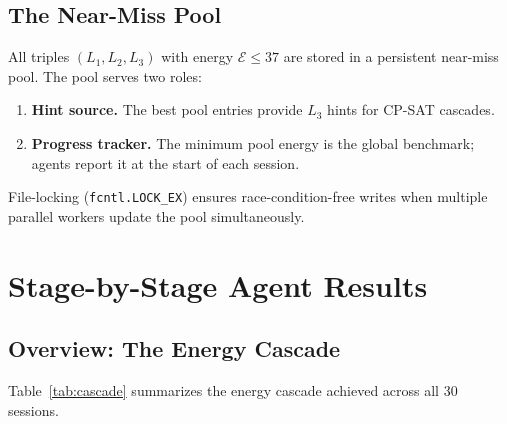 \documentclass[11pt,a4paper]{article}
\theoremstyle{remark}
\newcommand{\E}{\mathcal{E}}
\begin{document}
\subsection{The Near-Miss Pool}

All triples $(L_1, L_2, L_3)$ with energy $\E \leq 37$ are stored in a persistent near-miss
pool. The pool serves two roles:
\begin{enumerate}[noitemsep]
  \item \textbf{Hint source.} The best pool entries provide $L_3$ hints for CP-SAT cascades.
  \item \textbf{Progress tracker.} The minimum pool energy is the global benchmark; agents
    report it at the start of each session.
\end{enumerate}
File-locking (\texttt{fcntl.LOCK\_EX}) ensures race-condition-free writes when multiple
parallel workers update the pool simultaneously.

\section{Stage-by-Stage Agent Results}
\label{sec:results}

\subsection{Overview: The Energy Cascade}

Table~\ref{tab:cascade} summarizes the energy cascade achieved across all 30 sessions.
\end{document}
